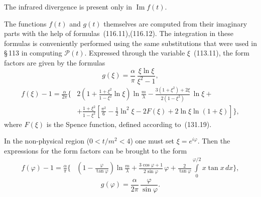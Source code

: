 The infrared divergence is present only in $\operatorname{Im} f(t)$.


The functions $f(t)$ and $g(t)$ themselves are computed from their imaginary parts with the help of formulas~(116.11),(116.12). The integration in these formulas is conveniently performed using the same substitutions that were used in \S\,113 in computing $\mathcal{P}(t)$. Expressed through the variable $\xi$~(113.11), the form factors are given by the formulas
\begin{equation}
g(\xi) = \frac{\alpha}{\pi}\,\frac{\xi\ln\xi}{\xi^2 - 1},
\label{eq:117.16}
\end{equation}
\begin{equation}
\begin{split}
f(\xi) - 1 = \frac{\alpha}{2\pi}\biggl\{&2\!\left(1 + \frac{1 + \xi^2}{1 - \xi^2}\ln\xi\right)\ln\frac{m}{\lambda} - \frac{3(1 + \xi^2) + 2\xi}{2(1 - \xi^2)}\,\ln\xi + {} \\
&+ \frac{1 + \xi^2}{1 - \xi^2}\!\left[\frac{\pi^2}{6} - \frac{1}{2}\ln^2\xi - 2F(\xi) + 2\ln\xi\ln(1 + \xi)\right]\biggr\},
\end{split}
\label{eq:117.17}
\end{equation}
where $F(\xi)$ is the Spence function, defined according to~(131.19).

In the non-physical region ($0 < t/m^2 < 4$) one must set $\xi = e^{i\varphi}$. Then the expressions for the form factors can be brought to the form
\begin{equation}
\begin{split}
f(\varphi) - 1 = \frac{\alpha}{\pi}\biggl\{&\left(1 - \frac{\varphi}{\tan\varphi}\right)\ln\frac{m}{\lambda} + \frac{3\cos\varphi + 1}{2\sin\varphi}\,\varphi + \frac{2}{\tan\varphi}\int\limits_0^{\varphi/2} x\tan x\,dx\biggr\},
\end{split}
\label{eq:117.18}
\end{equation}
\begin{equation}
g(\varphi) = \frac{\alpha}{2\pi}\,\frac{\varphi}{\sin\varphi}.
\label{eq:117.19}
\end{equation}

